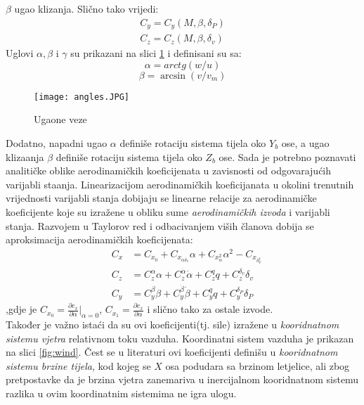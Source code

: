 $\beta$ ugao klizanja. Slično tako vrijedi:
\begin{eqnarray}
    C_y=C_y(M,\beta,\delta_P)\\
    C_z=C_z(M,\beta,\delta_v)
\end{eqnarray}
Uglovi $\alpha, \beta$ i $\gamma$ su prikazani na slici \ref{fig:angles} i definisani su sa:
\begin{equation}
    \alpha=arctg(w/u)
\end{equation}
\begin{equation}
    \beta=\arcsin(v/v_m)
\end{equation}
\begin{figure}[ht!]
    \centering
    \texttt{[image: angles.JPG]}
    \caption{Ugaone veze}
    \label{fig:angles}
\end{figure}
Dodatno, napadni ugao $\alpha$ definiše rotaciju sistema tijela oko $Y_b$ ose, a ugao klizaanja 
$\beta$ definiše rotaciju sistema tijela oko $Z_b$ ose. 
Sada je potrebno poznavati analitičke oblike aerodinamičkih koeficijenata u zavisnosti 
od odgovarajućih varijabli staanja. Linearizacijom aerodinamičkih koeficijanata u okolini trenutnih vrijednosti 
varijabli stanja dobijaju se linearne relacije za aerodinamičke koeficijente koje su 
izražene u obliku sume \textit{aerodinamičkih izvoda} i varijabli stanja.
Razvojem u Taylorov red i odbacivanjem viših članova dobija se aproksimacija 
aerodinamičkih koeficijenata:
\begin{eqnarray}
    &C_x&=C_{x_0}+C_{x_{\alpha\delta _v}}\alpha+C_{x_\alpha^2}\alpha^2-C_{x_{\delta _V^2}}\\
   &C_z&=C_z^{\alpha}{\alpha} + C_z^{\dot{\alpha}} \dot{\alpha}+C_z^q q+C_z^{\delta _v}{\delta _v}\\
    &C_y&=C_y^{\beta}{\beta} + C_y^{\dot{\beta}} \dot{\beta}+C_y^q q+C_y^{\delta _P}{\delta _P}
\end{eqnarray}
,gdje je $C_{x_0}=\frac{\partial c_x}{\partial \alpha}|_{\alpha=0}$, $C_{x_1}=\frac{\partial c_x}{\partial \alpha}$ 
i slično tako za ostale izvode.\\
Također je važno istaći da su ovi koeficijenti(tj. sile) izražene u \textit{kooridnatnom sistemu vjetra} 
relativnom toku vazduha. Koordinatni sistem vazduha je prikazan na slici \ref{fig:wind}. Čest se u literaturi 
ovi koeficijenti definišu u \textit{kooridnatnom sistemu brzine tijela}, kod kojeg se $X$ osa podudara sa 
brzinom letjelice, ali zbog pretpostavke da je brzina vjetra zanemariva u inercijalnom kooridnatnom sistemu razlika 
u ovim koordinatnim sistemima ne igra ulogu. 
